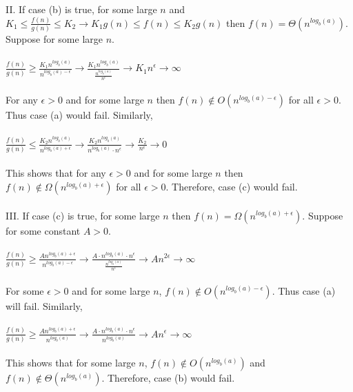 \documentclass{article}%
\begin{document}
\begin{enumerate}
II. If case (b) is true, for some large $n$ and $K_1 \leq \frac{f(n)}{g(n)} \leq K_2 \rightarrow K_1g(n) \leq f(n) \leq K_2g(n)$ then $f(n)=\Theta(n^{log_b(a)})$. Suppose for some large $n$.\\\\
$\frac{f(n)}{g(n)} \geq \frac{K_1n^{log_b(a)}}{n^{log_b(a)-\epsilon}} \rightarrow
\frac{K_1n^{log_b(a)}}{\frac{n^{log_b(a)}}{n^\epsilon}} \rightarrow K_1n^\epsilon \rightarrow \infty$\\\\
For any $\epsilon>0$ and for some large $n$ then $f(n) \not\in O(n^{log_b(a)-\epsilon})$ for all $\epsilon > 0$. Thus case (a) would fail. Similarly,\\\\
$\frac{f(n)}{g(n)} \leq \frac{K_2n^{log_b(a)}}{n^{log_b(a)+\epsilon}} \rightarrow
\frac{K_2n^{log_b(a)}}{n^{log_b(a)} \cdot n^\epsilon} \rightarrow \frac{K_2}{n^\epsilon} 
\rightarrow 0$\\\\
This shows that for any $\epsilon>0$ and for some large $n$ then $f(n) \not\in \Omega(n^{log_b(a)+\epsilon})$ for all $\epsilon > 0$. Therefore, case (c) would fail.\\\\

III. If case (c) is true, for some large $n$ then $f(n)=\Omega(n^{log_b(a)+\epsilon})$. Suppose for some constant $A>0$.\\\\
$\frac{f(n)}{g(n)} \geq \frac{An^{log_b(a)+\epsilon}}{n^{log_b(a)-\epsilon}} \rightarrow \frac{A \cdot n^{log_b(a)} \cdot n^{\epsilon}}{\frac{n^{log_b(a)}}{n^\epsilon}} \rightarrow An^{2\epsilon} \rightarrow \infty$\\\\
For some $\epsilon > 0$ and for some large $n$, $f(n) \not\in O(n^{log_b(a)-\epsilon})$. Thus case (a) will fail. Similarly,\\\\
$\frac{f(n)}{g(n)} \geq \frac{An^{log_b(a)+\epsilon}}{n^{log_b(a)}} \rightarrow
\frac{A \cdot n^{log_b(a)} \cdot n^\epsilon}{n^{log_b(a)}} \rightarrow An^\epsilon \rightarrow \infty$\\\\
This shows that for some large $n$, $f(n) \not\in O(n^{log_b(a)})$ and $f(n) \not\in \Theta(n^{log_b(a)})$. Therefore, case (b) would fail.

\end{enumerate}
\end{document}
